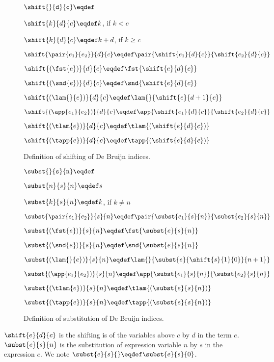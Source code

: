 \begin{figure}[ht]
  $\shift{\tt}{d}{c} \eqdef \tt$

  $\shift{k}{d}{c} \eqdef k$, if $k < c$

  $\shift{k}{d}{c} \eqdef k+d$, if $k \ge c$


  $\shift{\pair{e_{1}}{e_{2}}}{d}{c} \eqdef
  \pair{\shift{e_{1}}{d}{c}}{\shift{e_{2}}{d}{c}}$

  $\shift{(\fst{e})}{d}{c} \eqdef \fst{\shift{e}{d}{c}}$

  $\shift{(\snd{e})}{d}{c} \eqdef \snd{\shift{e}{d}{c}}$

  $\shift{(\lam{}{e})}{d}{c} \eqdef
  \lam{}{\shift{e}{d+1}{c}}$

  $\shift{(\app{e_{1}}{e_{2}})}{d}{c} \eqdef
  \app{\shift{e_{1}}{d}{c}}{\shift{e_{2}}{d}{c}}$

  $\shift{(\tlam{e})}{d}{c} \eqdef \tlam{(\shift{e}{d}{c})}$

  $\shift{(\tapp{e})}{d}{c} \eqdef \tapp{(\shift{e}{d}{c})}$

  \caption{\label{fig:shiftDB} Definition of shifting of De Bruijn indices.}
\end{figure}

\begin{figure}[ht]
  $\subst{\tt}{s}{n} \eqdef \tt$

  $\subst{n}{s}{n} \eqdef s$

  $\subst{k}{s}{n} \eqdef k$, if $k \neq n$

  $\subst{\pair{e_{1}}{e_{2}}}{s}{n} \eqdef
  \pair{\subst{e_{1}}{s}{n}}{\subst{e_{2}}{s}{n}}$

  $\subst{(\fst{e})}{s}{n} \eqdef \fst{\subst{e}{s}{n}}$

  $\subst{(\snd{e})}{s}{n} \eqdef \snd{\subst{e}{s}{n}}$

  $\subst{(\lam{}{e})}{s}{n} \eqdef
  \lam{}{\subst{e}{\shift{s}{1}{0}}{n+1}}$

  $\subst{(\app{e_{1}}{e_{2}})}{s}{n} \eqdef
  \app{\subst{e_{1}}{s}{n}}{\subst{e_{2}}{s}{n}}$

  $\subst{(\tlam{e})}{s}{n} \eqdef \tlam{(\subst{e}{s}{n})}$

  $\subst{(\tapp{e})}{s}{n} \eqdef \tapp{(\subst{e}{s}{n})}$


  \caption{\label{fig:substDB} Definition of substitution of De Bruijn indices.}
\end{figure}

$\shift{e}{d}{c}$ is the shifting is of the variables above $c$ by $d$ in the
term $e$.
$\subst{e}{s}{n}$ is the substitution of expression variable $n$ by $s$ in the
expression $e$. We note $\subst{e}{s}{} \eqdef \subst{e}{s}{0}$.
